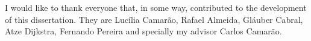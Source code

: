 I would like to thank everyone that, in some way, contributed to the development
of this dissertation.  They are Lucília Camarão, Rafael Almeida, Gláuber Cabral,
Atze Dijkstra, Fernando Pereira and specially my advisor Carlos Camarão.
